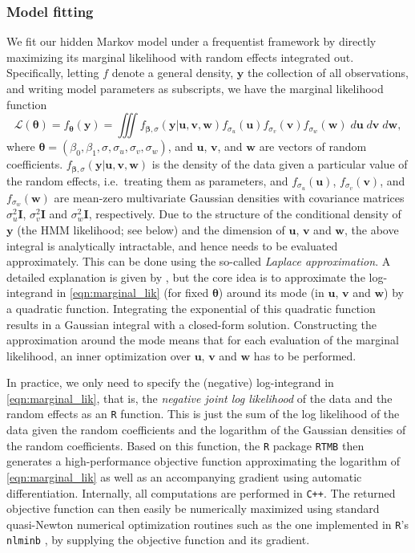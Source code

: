 \documentclass[namedate,webpdf,modern,medium]{oup-authoring-template}
\begin{document}
\subsubsection{Model fitting}

We fit our hidden Markov model under a frequentist framework by directly maximizing its marginal likelihood with random effects integrated out. Specifically, letting $f$ denote a general density, $\bm{y}$ the collection of all observations, and writing model parameters as subscripts, we have the marginal likelihood function
\begin{equation}
\label{eqn:marginal_lik}
    \mathcal{L}(\bm{\theta}) = f_{\bm{\theta}}(\bm{y}) = \iiint f_{\bm{\beta}, \sigma}(\bm{y} \vert \bm{u}, \bm{v}, \bm{w}) f_{\sigma_u}(\bm{u}) f_{\sigma_{v}}(\bm{v}) f_{\sigma_{w}}(\bm{w}) \; d\bm{u} \; d\bm{v} \; d\bm{w},
\end{equation}
where $\bm{\theta} = (\beta_0, \beta_1, \sigma, \sigma_u, \sigma_v, \sigma_w)$, and $\bm{u}$, $\bm{v}$, and $\bm{w}$ are vectors of random coefficients. 
$f_{\bm{\beta}, \sigma}(\bm{y} \vert \bm{u}, \bm{v}, \bm{w})$ is the density of the data given a particular value of the random effects, i.e.\ treating them as parameters, and $f_{\sigma_u}(\bm{u})$, $f_{\sigma_{v}}(\bm{v})$, and $f_{\sigma_{w}}(\bm{w})$ are mean-zero multivariate Gaussian densities with covariance matrices $\sigma_u^2 \bm{I}$, $\sigma_v^2 \bm{I}$ and $\sigma_w^2 \bm{I}$, respectively.
Due to the structure of the conditional density of $\bm{y}$ (the HMM likelihood; see below) and the dimension of $\bm{u}$, $\bm{v}$ and $\bm{w}$, the above integral is analytically intractable, and hence needs to be evaluated approximately. This can be done using the so-called \textit{Laplace approximation}. A detailed explanation is given by \citet{kristensen2016tmb}, but the core idea is to approximate the log-integrand in \eqref{eqn:marginal_lik} (for fixed $\bm{\theta}$) around its mode (in $\bm{u}$, $\bm{v}$ and $\bm{w}$) by a quadratic function. Integrating the exponential of this quadratic function results in a Gaussian integral with a closed-form solution. Constructing the approximation around the mode means that for each evaluation of the marginal likelihood, an inner optimization over $\bm{u}$, $\bm{v}$ and $\bm{w}$ has to be performed.

In practice, we only need to specify the (negative) log-integrand in \eqref{eqn:marginal_lik}, that is, the \emph{negative joint log likelihood} of the data and the random effects as an \texttt{R} function. This is just the sum of the log likelihood of the data given the random coefficients and the logarithm of the Gaussian densities of the random coefficients. Based on this function, the \texttt{R} package \texttt{RTMB} \citep{rtmb} then generates a high-performance objective function approximating the logarithm of \eqref{eqn:marginal_lik} as well as an accompanying gradient using automatic differentiation. Internally, all computations are performed in \texttt{C++}. The returned objective function can then easily be numerically maximized using standard quasi-Newton numerical optimization routines such as the one implemented in \texttt{R}'s \texttt{nlminb} \citep{gay1990usage}, by supplying the objective function and its gradient.
\end{document}
